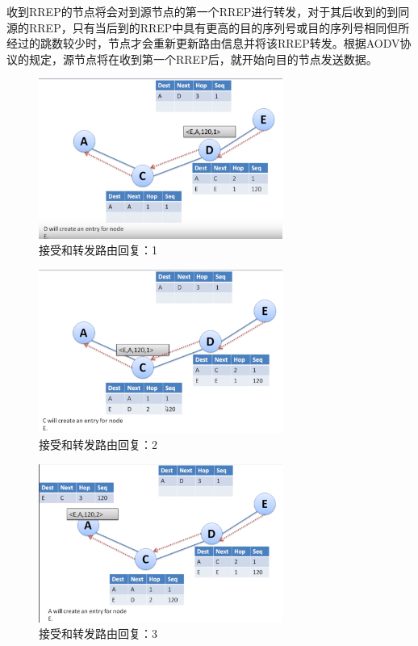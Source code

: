 \documentclass[12pt,a4paper]{article}
\begin{document}
收到RREP的节点将会对到源节点的第一个RREP进行转发，对于其后收到的到同源的RREP，只有当后到的RREP中具有更高的目的序列号或目的序列号相同但所经过的跳数较少时，节点才会重新更新路由信息并将该RREP转发。根据AODV协议的规定，源节点将在收到第一个RREP后，就开始向目的节点发送数据。

\begin{figure}[htb]
\centering
\includegraphics[width=8cm]{receive_route_reply_1}
\caption{接受和转发路由回复：1}
\end{figure}

\begin{figure}[htb]
\centering
\includegraphics[width=8cm]{receive_route_reply_2}
\caption{接受和转发路由回复：2}
\end{figure}

\begin{figure}[htb]
\centering
\includegraphics[width=8cm]{receive_route_reply_3}
\caption{接受和转发路由回复：3}
\end{figure}
\end{document}
